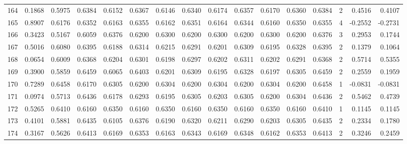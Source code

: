 \begin{tabular}{lrrrrrrrrrrrrrrr}
164 &      0.1868 &  0.5975 &  0.6384 &  0.6152 &  0.6367 &  0.6146 &  0.6340 &  0.6174 &  0.6357 &  0.6170 &   0.6360 &     0.6384 &      2 &                    0.4516 &                     0.4107 \\
165 &      0.8907 &  0.6176 &  0.6352 &  0.6163 &  0.6355 &  0.6162 &  0.6351 &  0.6164 &  0.6344 &  0.6160 &   0.6350 &     0.6355 &      4 &                   -0.2552 &                    -0.2731 \\
166 &      0.3423 &  0.5167 &  0.6059 &  0.6376 &  0.6200 &  0.6300 &  0.6200 &  0.6300 &  0.6200 &  0.6300 &   0.6200 &     0.6376 &      3 &                    0.2953 &                     0.1744 \\
167 &      0.5016 &  0.6080 &  0.6395 &  0.6188 &  0.6314 &  0.6215 &  0.6291 &  0.6201 &  0.6309 &  0.6195 &   0.6328 &     0.6395 &      2 &                    0.1379 &                     0.1064 \\
168 &      0.0654 &  0.6009 &  0.6368 &  0.6204 &  0.6301 &  0.6198 &  0.6297 &  0.6202 &  0.6311 &  0.6202 &   0.6291 &     0.6368 &      2 &                    0.5714 &                     0.5355 \\
169 &      0.3900 &  0.5859 &  0.6459 &  0.6065 &  0.6403 &  0.6201 &  0.6309 &  0.6195 &  0.6328 &  0.6197 &   0.6305 &     0.6459 &      2 &                    0.2559 &                     0.1959 \\
170 &      0.7289 &  0.6458 &  0.6170 &  0.6305 &  0.6200 &  0.6304 &  0.6200 &  0.6304 &  0.6200 &  0.6304 &   0.6200 &     0.6458 &      1 &                   -0.0831 &                    -0.0831 \\
171 &      0.0974 &  0.5713 &  0.6436 &  0.6178 &  0.6293 &  0.6195 &  0.6305 &  0.6203 &  0.6305 &  0.6200 &   0.6304 &     0.6436 &      2 &                    0.5462 &                     0.4739 \\
172 &      0.5265 &  0.6410 &  0.6160 &  0.6350 &  0.6160 &  0.6350 &  0.6160 &  0.6350 &  0.6160 &  0.6350 &   0.6160 &     0.6410 &      1 &                    0.1145 &                     0.1145 \\
173 &      0.4101 &  0.5881 &  0.6435 &  0.6105 &  0.6376 &  0.6190 &  0.6320 &  0.6211 &  0.6290 &  0.6203 &   0.6305 &     0.6435 &      2 &                    0.2334 &                     0.1780 \\
174 &      0.3167 &  0.5626 &  0.6413 &  0.6169 &  0.6353 &  0.6163 &  0.6343 &  0.6169 &  0.6348 &  0.6162 &   0.6353 &     0.6413 &      2 &                    0.3246 &                     0.2459 \\

\end{tabular}
